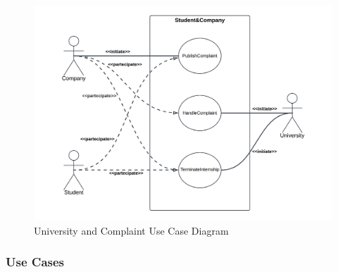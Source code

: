 \begin{figure}[H]
    \centering
    \includegraphics[width=1 \textwidth]{Diagrams/UseDiagrams/UniversityUseCaseDiagram.png}
    \caption{University and Complaint Use Case Diagram}
    \label{fig:UniveristyUseCaseDiagram}
\end{figure}


\subsubsection{Use Cases}


